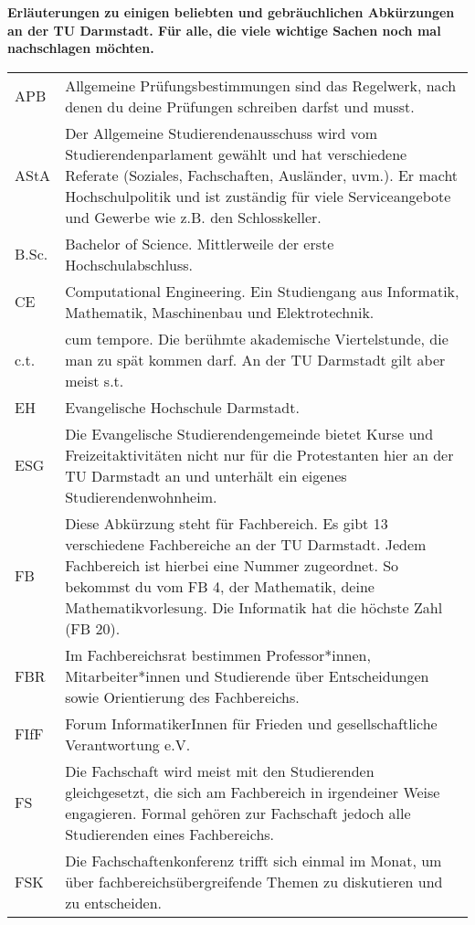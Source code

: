 
\textbf{Erläuterungen zu einigen beliebten und gebräuchlichen Abkürzungen an der TU Darmstadt. Für alle, die viele wichtige Sachen noch mal nachschlagen möchten.}

\begin{longtable}{p{20mm}p{85mm}}
APB		&	Allgemeine Prüfungsbestimmungen sind das Regelwerk, nach denen du deine Prüfungen schreiben darfst und musst.\\
AStA	&	Der Allgemeine Studierendenausschuss wird vom Studierendenparlament gewählt und hat verschiedene Referate (Soziales, Fachschaften, Ausländer, uvm.). Er macht Hochschulpolitik und ist zuständig für viele Serviceangebote und Gewerbe wie z.B. den Schlosskeller.\\
B.Sc.	&	Bachelor of Science. Mittlerweile der erste Hochschulabschluss.\\
CE		&	Computational Engineering. Ein Studiengang aus Informatik, Mathematik, Maschinenbau und Elektrotechnik.\\
c.t.	&	cum tempore. Die berühmte akademische Viertelstunde, die man zu spät kommen darf. An der TU Darmstadt gilt aber meist s.t.\\
EH		&	Evangelische Hochschule Darmstadt.\\
ESG		&	Die Evangelische Studierendengemeinde bietet Kurse und Freizeitaktivitäten nicht nur für die Protestanten hier an der TU Darmstadt an und unterhält ein eigenes Studierendenwohnheim.\\
FB		&	Diese Abkürzung steht für Fachbereich. Es gibt 13 verschiedene Fachbereiche an der TU Darmstadt. Jedem Fachbereich ist hierbei eine Nummer zugeordnet. So bekommst du vom FB 4, der Mathematik, deine Mathematikvorlesung. Die Informatik hat die höchste Zahl (FB 20).\\
FBR		&	Im Fachbereichsrat bestimmen Professor*innen, Mitarbeiter*innen und Studierende über Entscheidungen sowie Orientierung des Fachbereichs.\\
FIfF	&	Forum InformatikerInnen für Frieden und gesellschaftliche Verantwortung e.V.\\
FS		&	Die Fachschaft wird meist mit den Studierenden gleichgesetzt, die sich am Fachbereich in irgendeiner Weise engagieren. Formal gehören zur Fachschaft jedoch alle Studierenden eines Fachbereichs.\\
FSK		&	Die Fachschaftenkonferenz trifft sich einmal im Monat, um über fachbereichsübergreifende Themen zu diskutieren und zu entscheiden.\\

\end{longtable}
